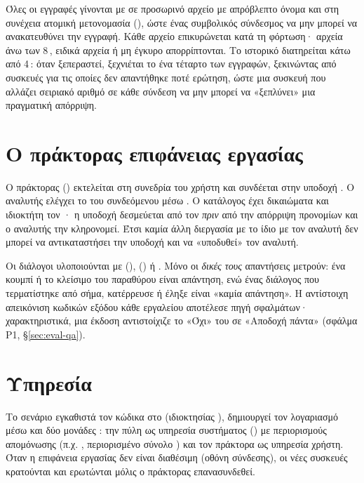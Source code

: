 Όλες οι εγγραφές γίνονται με  σε
προσωρινό αρχείο με απρόβλεπτο όνομα και στη συνέχεια ατομική μετονομασία
(), ώστε ένας συμβολικός σύνδεσμος να μην μπορεί να ανακατευθύνει
την εγγραφή. Κάθε αρχείο επικυρώνεται κατά τη φόρτωση· αρχεία άνω των 8\,,
ειδικά αρχεία ή μη έγκυρο  απορρίπτονται. Το ιστορικό διατηρείται κάτω
από 4\,: όταν ξεπεραστεί, ξεχνιέται το ένα τέταρτο των εγγραφών,
ξεκινώντας από συσκευές για τις οποίες δεν απαντήθηκε ποτέ ερώτηση, ώστε μια
συσκευή που αλλάζει σειριακό αριθμό σε κάθε σύνδεση να μην μπορεί να «ξεπλύνει»
μια πραγματική απόρριψη.

\section{Ο πράκτορας επιφάνειας εργασίας}
\label{sec:impl-agent}

Ο πράκτορας () εκτελείται στη συνεδρία του χρήστη και συνδέεται
στην υποδοχή . Ο αναλυτής ελέγχει το  του
συνδεόμενου μέσω . Ο κατάλογος έχει δικαιώματα 
και ιδιοκτήτη τον · η υποδοχή δεσμεύεται από τον 
\emph{πριν} από την απόρριψη προνομίων και ο αναλυτής την κληρονομεί. Έτσι καμία
άλλη διεργασία με το ίδιο  με τον αναλυτή δεν μπορεί να αντικαταστήσει
την υποδοχή και να «υποδυθεί» τον αναλυτή.

Οι διάλογοι υλοποιούνται με  (),  () ή
. Μόνο οι \emph{δικές τους} απαντήσεις μετρούν: ένα κουμπί ή το
κλείσιμο του παραθύρου είναι απάντηση, ενώ ένας διάλογος που τερματίστηκε από
σήμα, κατέρρευσε ή έληξε είναι «καμία απάντηση». Η αντίστοιχη απεικόνιση
κωδικών εξόδου κάθε εργαλείου αποτέλεσε πηγή σφαλμάτων· χαρακτηριστικά, μια
έκδοση αντιστοίχιζε το «Όχι» του  σε «Αποδοχή πάντα» (σφάλμα P1,
§\ref{sec:eval-qa}).

\section{Υπηρεσία }
\label{sec:impl-systemd}

Το σενάριο  εγκαθιστά τον κώδικα στο 
(ιδιοκτησίας ), δημιουργεί τον λογαριασμό  μέσω
 και δύο μονάδες : την πύλη ως υπηρεσία συστήματος
() με περιορισμούς απομόνωσης (π.χ.
, περιορισμένο σύνολο ) και τον
πράκτορα ως υπηρεσία χρήστη. Όταν η επιφάνεια εργασίας δεν είναι διαθέσιμη
(οθόνη σύνδεσης), οι νέες συσκευές κρατούνται και ερωτώνται μόλις ο πράκτορας
επανασυνδεθεί.
